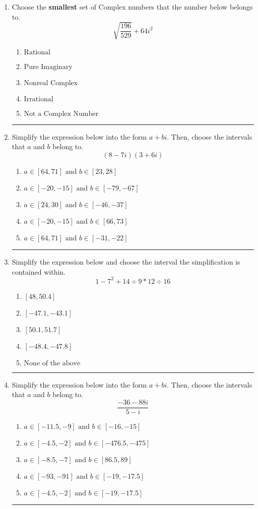 \documentclass[14pt]{extbook}
\newcommand{\litem}[1]{\item#1\hspace*{-1cm}\rule{\textwidth}{0.4pt}}
\begin{document}
\begin{enumerate}
\litem{
Choose the \textbf{smallest} set of Complex numbers that the number below belongs to.\[ \sqrt{\frac{196}{529}} + 64i^2 \]\begin{enumerate}[label=\Alph*.]
\item \( \text{Rational} \)
\item \( \text{Pure Imaginary} \)
\item \( \text{Nonreal Complex} \)
\item \( \text{Irrational} \)
\item \( \text{Not a Complex Number} \)

\end{enumerate} }
\litem{
Simplify the expression below into the form $a+bi$. Then, choose the intervals that $a$ and $b$ belong to.\[ (8 - 7 i)(3 + 6 i) \]\begin{enumerate}[label=\Alph*.]
\item \( a \in [64, 71] \text{ and } b \in [23, 28] \)
\item \( a \in [-20, -15] \text{ and } b \in [-79, -67] \)
\item \( a \in [24, 30] \text{ and } b \in [-46, -37] \)
\item \( a \in [-20, -15] \text{ and } b \in [66, 73] \)
\item \( a \in [64, 71] \text{ and } b \in [-31, -22] \)

\end{enumerate} }
\litem{
Simplify the expression below and choose the interval the simplification is contained within.\[ 1 - 7^2 + 14 \div 9 * 12 \div 16 \]\begin{enumerate}[label=\Alph*.]
\item \( [48, 50.4] \)
\item \( [-47.1, -43.1] \)
\item \( [50.1, 51.7] \)
\item \( [-48.4, -47.8] \)
\item \( \text{None of the above} \)

\end{enumerate} }
\litem{
Simplify the expression below into the form $a+bi$. Then, choose the intervals that $a$ and $b$ belong to.\[ \frac{-36 - 88 i}{5 - i} \]\begin{enumerate}[label=\Alph*.]
\item \( a \in [-11.5, -9] \text{ and } b \in [-16, -15] \)
\item \( a \in [-4.5, -2] \text{ and } b \in [-476.5, -475] \)
\item \( a \in [-8.5, -7] \text{ and } b \in [86.5, 89] \)
\item \( a \in [-93, -91] \text{ and } b \in [-19, -17.5] \)
\item \( a \in [-4.5, -2] \text{ and } b \in [-19, -17.5] \)


\end{enumerate}}
\end{enumerate}
\end{document}
